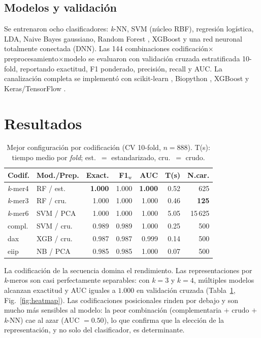 \documentclass[twocolumn,10pt]{article}
\begin{document}
\subsection{Modelos y validación}
Se entrenaron ocho clasificadores: \textit{k}-NN, SVM (núcleo RBF), regresión logística, LDA, Naive
Bayes gaussiano, Random Forest \cite{breiman2001}, XGBoost \cite{chen2016} y una red neuronal
totalmente conectada (DNN). Las 144 combinaciones codificación$\times$preprocesamiento$\times$modelo
se evaluaron con validación cruzada estratificada 10-fold, reportando exactitud, F1 ponderado,
precisión, recall y AUC. La canalización completa se implementó con scikit-learn \cite{pedregosa2011},
Biopython \cite{cock2009}, XGBoost \cite{chen2016} y Keras/TensorFlow \cite{tensorflow2016}.

\section{Resultados}
\begin{table}[t]
\centering\footnotesize
\setlength{\tabcolsep}{3pt}
\caption{Mejor configuración por codificación (CV 10-fold, $n=888$). T(s): tiempo medio por
\textit{fold}; est.\ $=$ estandarizado, cru.\ $=$ crudo.}
\label{tab:best}
\begin{tabular}{@{}llrrrrr@{}}
\toprule
Codif. & Mod./Prep. & Exact. & F1$_\text{w}$ & AUC & T(s) & N.car. \\
\midrule
\textit{k}-mer4 & RF / est.  & \textbf{1.000} & 1.000 & \textbf{1.000} & 0.52 & 625 \\
\textit{k}-mer3 & RF / cru.  & 1.000 & 1.000 & 1.000 & 0.46 & \textbf{125} \\
\textit{k}-mer6 & SVM / PCA  & 1.000 & 1.000 & 1.000 & 5.05 & 15\,625 \\
compl.          & SVM / cru. & 0.989 & 0.989 & 1.000 & 0.25 & 500 \\
dax             & XGB / cru. & 0.987 & 0.987 & 0.999 & 0.14 & 500 \\
eiip            & NB / PCA   & 0.985 & 0.985 & 1.000 & 0.07 & 500 \\
\bottomrule
\end{tabular}
\end{table}

La codificación de la secuencia domina el rendimiento. Las representaciones por \textit{k}-meros son
casi perfectamente separables: con $k=3$ y $k=4$, múltiples modelos alcanzan exactitud y AUC iguales
a $1{.}000$ en validación cruzada (Tabla~\ref{tab:best}, Fig.~\ref{fig:heatmap}). Las codificaciones
posicionales rinden por debajo y son mucho más sensibles al modelo: la peor combinación
(complementaria $+$ crudo $+$ \textit{k}-NN) cae al azar (AUC $=0{.}50$), lo que confirma que la
elección de la representación, y no solo del clasificador, es determinante.
\end{document}
